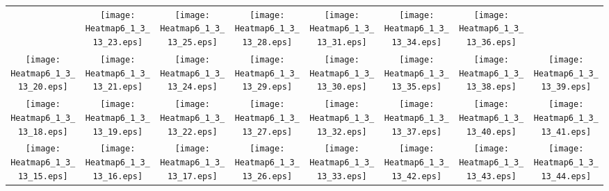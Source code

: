 \documentclass{standalone}
\begin{document}
\renewcommand{\arraystretch}{0}
\setlength{\tabcolsep}{0pt}
\begin{tabular}{ *8{c} }
 & \texttt{[image: Heatmap6\_1\_3\_13\_23.eps]} & \texttt{[image: Heatmap6\_1\_3\_13\_25.eps]} & \texttt{[image: Heatmap6\_1\_3\_13\_28.eps]} & \texttt{[image: Heatmap6\_1\_3\_13\_31.eps]} & \texttt{[image: Heatmap6\_1\_3\_13\_34.eps]} & \texttt{[image: Heatmap6\_1\_3\_13\_36.eps]} &  \\
\texttt{[image: Heatmap6\_1\_3\_13\_20.eps]} & \texttt{[image: Heatmap6\_1\_3\_13\_21.eps]} & \texttt{[image: Heatmap6\_1\_3\_13\_24.eps]} & \texttt{[image: Heatmap6\_1\_3\_13\_29.eps]} & \texttt{[image: Heatmap6\_1\_3\_13\_30.eps]} & \texttt{[image: Heatmap6\_1\_3\_13\_35.eps]} & \texttt{[image: Heatmap6\_1\_3\_13\_38.eps]} & \texttt{[image: Heatmap6\_1\_3\_13\_39.eps]} \\
\texttt{[image: Heatmap6\_1\_3\_13\_18.eps]} & \texttt{[image: Heatmap6\_1\_3\_13\_19.eps]} & \texttt{[image: Heatmap6\_1\_3\_13\_22.eps]} & \texttt{[image: Heatmap6\_1\_3\_13\_27.eps]} & \texttt{[image: Heatmap6\_1\_3\_13\_32.eps]} & \texttt{[image: Heatmap6\_1\_3\_13\_37.eps]} & \texttt{[image: Heatmap6\_1\_3\_13\_40.eps]} & \texttt{[image: Heatmap6\_1\_3\_13\_41.eps]} \\
\texttt{[image: Heatmap6\_1\_3\_13\_15.eps]} & \texttt{[image: Heatmap6\_1\_3\_13\_16.eps]} & \texttt{[image: Heatmap6\_1\_3\_13\_17.eps]} & \texttt{[image: Heatmap6\_1\_3\_13\_26.eps]} & \texttt{[image: Heatmap6\_1\_3\_13\_33.eps]} & \texttt{[image: Heatmap6\_1\_3\_13\_42.eps]} & \texttt{[image: Heatmap6\_1\_3\_13\_43.eps]} & \texttt{[image: Heatmap6\_1\_3\_13\_44.eps]} \\

\end{tabular}
\end{document}
